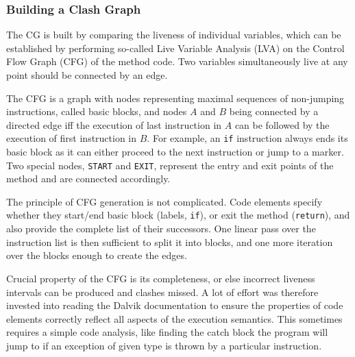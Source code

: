 \documentclass[12pt,twoside,notitlepage]{report}
\begin{document}
\subsubsection{Building a Clash Graph}

The CG is built by comparing the liveness of individual variables, which can be established by performing so-called Live Variable Analysis (LVA) on the Control Flow Graph (CFG) of the method code. Two variables simultaneously live at any point should be connected by an edge.

The CFG is a graph with nodes representing maximal sequences of non-jumping instructions, called basic blocks, and nodes $A$ and $B$ being connected by a directed edge iff the execution of last instruction in $A$ can be followed by the execution of first instruction in $B$. For example, an \verb$if$ instruction always ends its basic block as it can either proceed to the next instruction or jump to a marker. Two special nodes, \verb$START$ and \verb$EXIT$, represent the entry and exit points of the method and are connected accordingly.

The principle of CFG generation is not complicated. Code elements specify whether they start/end basic block (labels, \verb$if$), or exit the method (\verb$return$), and also provide the complete list of their successors. One linear pass over the instruction list is then sufficient to split it into blocks, and one more iteration over the blocks enough to create the edges.

Crucial property of the CFG is its completeness, or else incorrect liveness intervals can be produced and clashes missed. A lot of effort was therefore invested into reading the Dalvik documentation to ensure the properties of code elements correctly reflect all aspects of the execution semantics. This sometimes requires a simple code analysis, like finding the catch block the program will jump to if an exception of given type is thrown by a particular instruction. 
\end{document}
